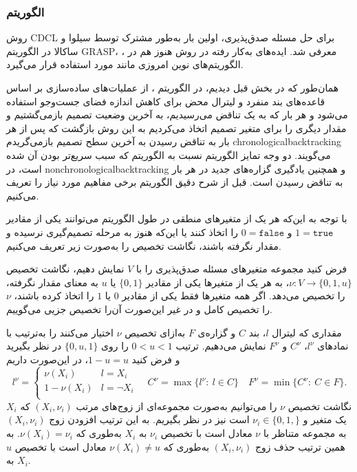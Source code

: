 \subsubsection*{الگوریتم‌ }
روش
\gls*{CDCL}
برای حل مسئله صدق‌پذیری، اولین بار به‌طور مشترک توسط  سیلوا 
و ساکالا 
در الگوریتم 
\gls*{GRASP}، 
\cite{marques1999grasp}، 
\cite{silva1997grasp}
 معرفی شد. ایده‌های به‌کار رفته در  روش 
هنوز هم در الگوریتم‌های نوین امروزی مانند 
مورد استفاده قرار می‌گیرد.

همان‌طور که در بخش قبل دیدیم، در الگوریتم 
، 
از عملیات‌های ساده‌سازی بر اساس قاعده‌های بند منفرد و لیترال محض برای  کاهش اندازه فضای جست‌وجو استفاده می‌شود و هر بار که به یک تناقض می‌رسیدیم، به آخرین وضعیت تصمیم بازمی‌گشتیم و مقدار دیگری را برای متغیر تصمیم اتخاذ می‌کردیم به این روش بازگشت که پس از هر بار به تناقض رسیدن   به آخرین سطح تصمیم بازمی‌گریدم 
\gls*{chronologicalbacktracking}
می‌گویند.   دو وجه تمایز الگوریتم‌
نسبت به الگوریتم‌ 
که سبب سریع‌تر بودن آن شده است، 
در  
\gls*{nonchronologicalbacktracking}
و همچنین یادگیری گزاره‌های جدید در هر بار به تناقض رسیدن است.  قبل از شرح دقیق الگوریتم 
برخی مفاهیم مورد نیاز را تعریف می‌کنیم. 

با توجه به این‌که هر یک از متغیرهای منطقی در طول الگوریتم می‌توانند یکی از مقادیر 
$1= \texttt{true}$
و
$0 = \texttt{false}$
را اتخاذ کنند یا این‌که هنوز به مرحله تصمیم‌گیری نرسیده  و مقدار نگرفته باشند، نگاشت تخصیص را به‌صورت زیر تعریف می‌کنیم. 

\begin{definition}
فرض کنید  مجموعه متغیرهای  مسئله صدق‌پذیری را با 
$V$
نمایش دهیم،  نگاشت تخصیص 
$\nu:V\rightarrow \{0, 1, u\}$، 
 به هر یک از متغیر‌ها  یکی از مقادیر 
$\{0, 1\}$
یا 
$u$
به معنای مقدار نگرفته، را تخصیص می‌دهد.  اگر  همه متغیرها فقط یکی از مقادیر 
$0$
یا 
$1$
را اتخاذ کرده‌ باشند، 
$\nu$
را تخصیص کامل و در غیر این‌صورت آن‌را تخصیص جزيی می‌گوییم.
\end{definition}
مقداری که لیترال 
$l$،
 بند 
$C$
و  گزاره‌ی 
$F$
به‌ازای  تخصیص 
$\nu$
اختیار می‌کنند را به‌ترتیب با نمادهای 
$l^{\nu}$،
$C^{\nu}$
و 
$F^{\nu}$
نمایش می‌دهیم. ترتیب 
$0 < u < 1$ 
را روی 
$\{0, u, 1\}$
در نظر بگیرید و فرض کنید 
$1 - u = u$، 
در این‌صورت داریم 
\begin{equation*}
l^{\nu} = \left \{
\begin{array}{lc}
\nu(X_{i})& l = X_{i}\\
1 - \nu(X_{i}) & l = \neg X_{i}\\
\end{array} \right.
\quad C^{\nu} = \max\{l^{\nu}: \ l\in C\} \quad
 F^{\nu} = \min\{C^{\nu}: \ C\in F\}.
\end{equation*}
نگاشت تخصیص 
$\nu$
را می‌توانیم  به‌صورت مجموعه‌ای از زوج‌های مرتب 
$(X_{i}, \nu_{i})$
که 
$X_{i}$
یک متغیر و 
$\nu_{i}\in \{0, 1,\}$
است نیز  در نظر بگیریم. به این ترتیب افزودن زوج 
$(X_{i}, \nu_{i})$ 
به  مجموعه متناظر با 
$\nu$
معادل است با تخصیص 
$\nu_{i}$
به 
$X_{i}$
به‌طوری که 
$\nu(X_{i}) = \nu_{i}$. 
به همین ترتیب حذف زوج 
$(X_{i}, \nu_{i})$
به‌طوری که 
$\nu(X_{i})\neq u$
معادل است با تخصیص 
$u$
به 
$X_{i}$. 

